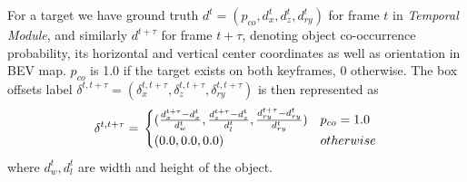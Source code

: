 \documentclass[letterpaper, 10pt, conference]{ieeeconf}  %
\begin{document}
For a target we have ground truth $d^t = (p_{co}, d^t_x, d^t_z, d^t_{ry})$ for frame $t$ in \textit{Temporal Module}, and similarly $d^{t+\tau}$ for frame $t+\tau$, denoting object co-occurrence probability, its horizontal and vertical center coordinates as well as orientation in BEV map. $p_{co}$ is 1.0 if the target exists on both keyframes, 0 otherwise. The box offsets label $\delta^{t, t+\tau} = (\delta^{t,t+\tau}_{x}, \delta^{t,t+\tau}_{z}, \delta^{t,t+\tau}_{ry})$ is then represented as
\begin{equation}
\delta^{t, t+\tau} = \\
\begin{cases}
(\frac{d_{x}^{t+\tau} - d_{x}^{t}}{d^t_{w}}, \frac{d_{z}^{t+\tau} - d_{z}^{t} }{d^t_{l}}, \frac{d_{ry}^{t+\tau} - d_{ry}^{t}}{d^t_{ry}}) & p_{co} = 1.0 \\
(0.0,0.0, 0.0) &  otherwise
\end{cases}
\end{equation}
where $d^t_{w}, d^t_{l}$ are width and height of the object.


\end{document}
